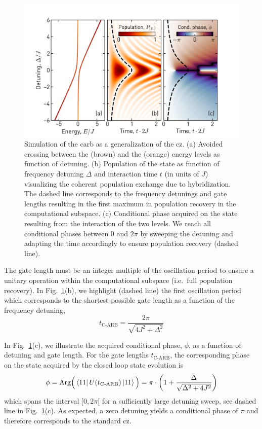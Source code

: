 \begin{figure}
    \centering
    \includegraphics[width=1\textwidth]{chapters/carb_gate/figs/ch4_carb_theory_c3_20200312_095516.png}
    \caption{Simulation of the \gls{carb} as a generalization of the \gls{cz}. (a) Avoided crossing between the \oo{} (brown) and the \tz{} (orange) energy levels as function of detuning. (b) Population of the \oo{} state as function of frequency detuning $\Delta$ and interaction time $t$ (in units of $J$) visualizing the coherent population exchange due to hybridization. The dashed line corresponds to the frequency detunings and gate lengths resulting in the first maximum in population recovery in the computational subspace. (c) Conditional phase acquired on the \oo{} state resulting from the interaction of the two levels. We reach all conditional phases between 0 and $2\pi$ by sweeping the detuning and adapting the time accordingly to ensure population recovery (dashed line). }
    \label{fig:carb_theory}
\end{figure}

The gate length must be an integer multiple of the oscillation period to ensure a unitary operation within the computational subspace (i.e.\ full population recovery). In Fig.~\ref{fig:carb_theory}(b), we highlight (dashed line) the first oscillation period which corresponds to the shortest possible gate length as a function of the frequency detuning,
\begin{equation} \label{eq:carb_t_gate}
    t_{\textrm{C-ARB}} = \frac{2\pi}{\sqrt{4J^2+\Delta^2}}
\end{equation}

In  Fig.~\ref{fig:carb_theory}(c),  we illustrate the acquired conditional phase, $\phi$, as a function of detuning and gate length. For the gate lengths $t_{\textrm{C-ARB}}$, the corresponding phase on the \oo{} state acquired by the closed loop state evolution is
 \begin{equation} \label{eq:ch4_acquired_cond_phase}
     \phi = \mathrm{Arg}\Big(\bra{11}U(t_{\textrm{C-ARB}})\ket{11}\Big) =  \pi \cdot \left( 1 + \frac { \Delta } { \sqrt { \Delta ^ { 2 } + 4 J ^ { 2 } } } \right)
 \end{equation}
which spans the interval $[0, 2\pi[$ for a sufficiently large detuning sweep, see dashed line in Fig.~\ref{fig:carb_theory}(c). As expected, a zero detuning yields a conditional phase of $\pi$ and therefore corresponds to the standard \gls{cz}.

